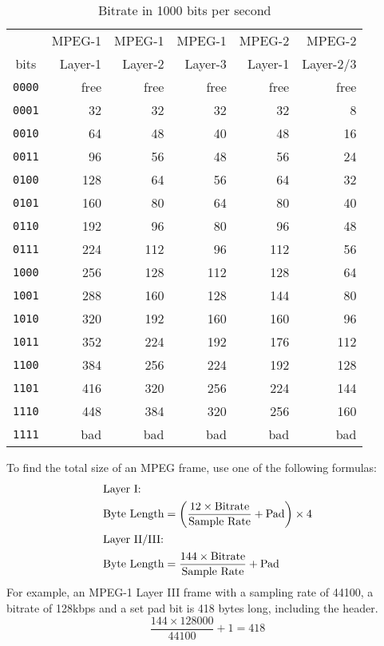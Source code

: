 \pagebreak

\begin{table}[h]
{
\begin{tabular}{|c||r|r|r|r|r|}
\hline
& MPEG-1 & MPEG-1 & MPEG-1 & MPEG-2 & MPEG-2 \\
bits & Layer-1 & Layer-2 & Layer-3 & Layer-1 & Layer-2/3 \\
\hline
\texttt{0000} & free & free & free & free & free \\
\texttt{0001} & 32 & 32 & 32 & 32 & 8 \\
\texttt{0010} & 64 & 48 & 40 & 48 & 16 \\
\texttt{0011} & 96 & 56 & 48 & 56 & 24 \\
\texttt{0100} & 128 & 64 & 56 & 64 & 32 \\
\texttt{0101} & 160 & 80 & 64 & 80 & 40 \\
\texttt{0110} & 192 & 96 & 80 & 96 & 48 \\
\texttt{0111} & 224 & 112 & 96 & 112 & 56 \\
\texttt{1000} & 256 & 128 & 112 & 128 & 64 \\
\texttt{1001} & 288 & 160 & 128 & 144 & 80 \\
\texttt{1010} & 320 & 192 & 160 & 160 & 96 \\
\texttt{1011} & 352 & 224 & 192 & 176 & 112 \\
\texttt{1100} & 384 & 256 & 224 & 192 & 128 \\
\texttt{1101} & 416 & 320 & 256 & 224 & 144 \\
\texttt{1110} & 448 & 384 & 320 & 256 & 160 \\
\texttt{1111} & bad & bad & bad & bad & bad \\
\hline
\end{tabular}
}
\caption{Bitrate in 1000 bits per second}
\end{table}
To find the total size of an MPEG frame, use one of the following
formulas:
\begin{align}
\intertext{Layer I:}
\text{Byte Length} &= \left ( \frac{12 \times \text{Bitrate}}{\text{Sample Rate}} + \text{Pad} \right ) \times 4 \\
\intertext{Layer II/III:}
\text{Byte Length} &= \frac{144 \times \text{Bitrate}}{\text{Sample Rate}} + \text{Pad}
\end{align}
For example, an MPEG-1 Layer III frame with a sampling rate of 44100,
a bitrate of 128kbps and a set pad bit is 418 bytes long, including the header.
\begin{equation}
\frac{144 \times 128000}{44100} + 1 = 418
\end{equation}

